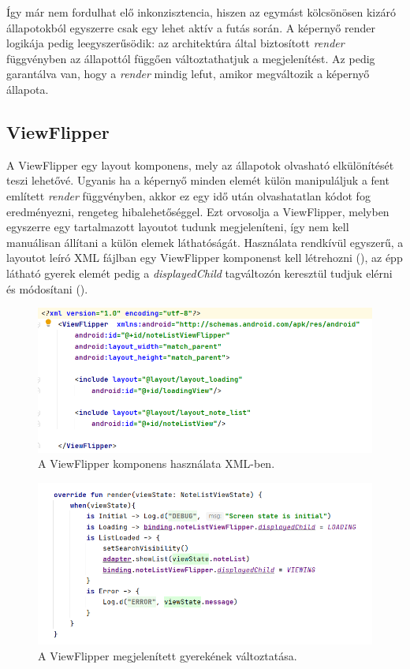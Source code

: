 Így már nem fordulhat elő inkonzisztencia, hiszen az egymást kölcsönösen kizáró állapotokból egyszerre csak egy lehet aktív a futás során. A képernyő render logikája pedig leegyszerűsödik: az architektúra által biztosított \emph{render} függvényben az állapottól függően változtathatjuk a megjelenítést. Az pedig garantálva van, hogy a \emph{render} mindig lefut, amikor megváltozik a képernyő állapota. 

\subsection{ViewFlipper}
A ViewFlipper egy layout komponens, mely az állapotok olvasható elkülönítését teszi lehetővé. \cite{ViewFlipper} Ugyanis ha a képernyő minden elemét külön manipuláljuk a fent említett \emph{render} függvényben, akkor ez egy idő után olvashatatlan kódot fog eredményezni, rengeteg hibalehetőséggel. Ezt orvosolja a ViewFlipper, melyben egyszerre egy tartalmazott layoutot tudunk megjeleníteni, így nem kell manuálisan állítani a külön elemek láthatóságát. Használata rendkívül egyszerű, a layoutot leíró XML fájlban egy ViewFlipper komponenst kell létrehozni (), az épp látható gyerek elemét pedig a \emph{displayedChild} tagváltozón keresztül tudjuk elérni és módosítani ().

\begin{figure}[!ht]
	\centering
	\includegraphics[width=150mm, keepaspectratio]{figures/view_flipper_impl.png}
	\caption{A ViewFlipper komponens használata XML-ben.}
	\label{fig:ViewFlipperComponent}
\end{figure}

\begin{figure}[!ht]
	\centering
	\includegraphics[width=150mm, keepaspectratio]{figures/view_flipper_usage.png}
	\caption{A ViewFlipper megjelenített gyerekének változtatása.}
	\label{fig:ViewFlipperUsage}
\end{figure}

